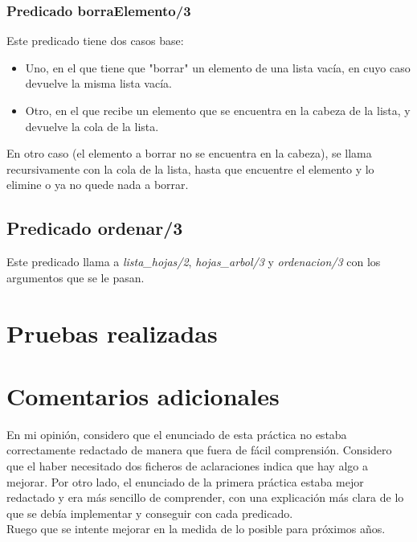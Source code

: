 \documentclass[12pt, a4paper, spanish]{article}
\begin{document}
\subsubsection{Predicado borraElemento/3}


Este predicado tiene dos casos base:

\begin{itemize}
	\item Uno, en el que tiene que "borrar" un elemento de una lista vacía, en cuyo caso devuelve la misma lista vacía.
	
	\item Otro, en el que recibe un elemento que se encuentra en la cabeza de la lista, y devuelve la cola de la lista.
\end{itemize}

En otro caso (el elemento a borrar no se encuentra en la cabeza), se llama recursivamente con la cola de la lista, hasta que encuentre el elemento y lo elimine o ya no quede nada a borrar.

\subsection{Predicado ordenar/3}


Este predicado llama a \textit{lista\_hojas/2}, \textit{hojas\_arbol/3} y \textit{ordenacion/3} con los argumentos que se le pasan.
\newpage

\section{Pruebas realizadas}


\newpage
\section{Comentarios adicionales}

En mi opinión, considero que el enunciado de esta práctica no estaba correctamente redactado de manera que fuera de fácil comprensión. Considero que el haber necesitado dos ficheros de aclaraciones indica que hay algo a mejorar. Por otro lado, el enunciado de la primera práctica estaba mejor redactado y era más sencillo de comprender, con una explicación más clara de lo que se debía implementar y conseguir con cada predicado.\\

Ruego que se intente mejorar en la medida de lo posible para próximos años.
\end{document}
